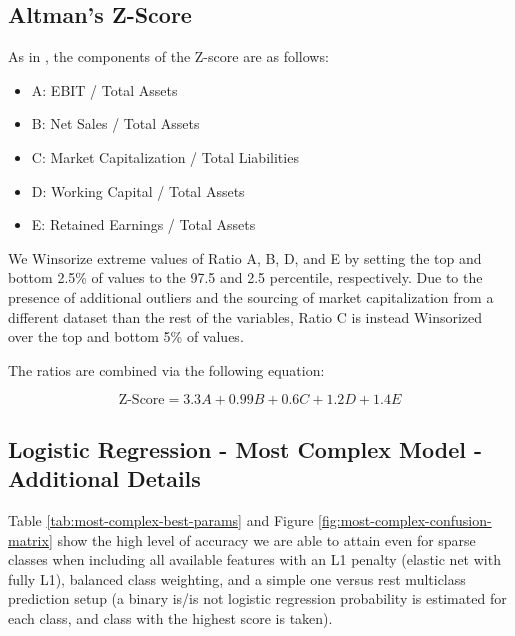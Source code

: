 \documentclass{article}[11pt]
\begin{document}
    \clearpage
    \newpage

    \subsection{Altman's Z-Score}

    \label{sec:altman-z-score}

    As in \cite{das_credit_2023}, the components of the Z-score are as follows:

    \begin{itemize}
        \item A: EBIT / Total Assets
        \item B: Net Sales / Total Assets
        \item C: Market Capitalization / Total Liabilities
        \item D: Working Capital / Total Assets
        \item E: Retained Earnings / Total Assets
    \end{itemize}

    We Winsorize extreme values of Ratio A, B, D, and E by setting the top and bottom 2.5\% of values to the 97.5 and 2.5 percentile, respectively. Due to the presence of additional outliers and the sourcing of market capitalization from a different dataset than the rest of the variables, Ratio C is instead Winsorized over the top and bottom 5\% of values. 

    The ratios are combined via the following equation:

    \begin{equation*}
        \text{Z-Score} = 3.3 A + 0.99 B + 0.6 C + 1.2 D + 1.4 E
    \end{equation*}

    \clearpage
    \newpage
    \subsection{Logistic Regression - Most Complex Model - Additional Details}

    \label{sec:most-complex-model-additional-details}

    Table \ref{tab:most-complex-best-params} and Figure \ref{fig:most-complex-confusion-matrix} show the high level of accuracy we are able to attain even for sparse classes when including all available features with an L1 penalty (elastic net with fully L1), balanced class weighting, and a simple one versus rest multiclass prediction setup (a binary is/is not logistic regression probability is estimated for each class, and class with the highest score is taken).
\end{document}
